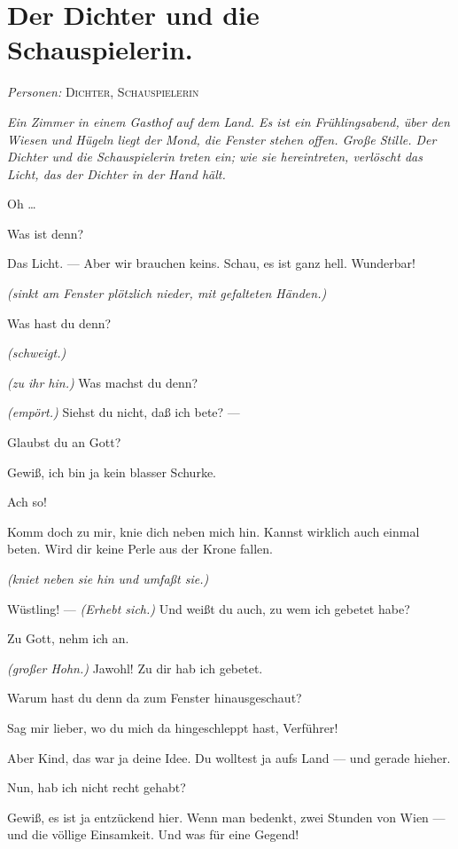 \documentclass[
	final,
	a4paper,
	ngerman,
	mpinclude = true, %
	twoside = true,
	open = right,
	cleardoublepage = plain,
	DIV = 13,
	BCOR = 1cm,
	titlepage = firstiscover,
	]{scrbook}
\newcommand{\scene}{\section}
\newcommand{\direction}[1]{\textit{(#1)}}
\newcommand{\setting}[1]{\vspace{-0.5\baselineskip}\centering\textit{#1}}
\newcommand{\characterlist}[1]{{\begin{center}\textit{Personen:} #1\end{center}}}
\newcommand{\thecharacter}[1]{\textup{\textsc{#1}}}
\newcommand{\thedichter}{\thecharacter{Dichter}}
\newcommand{\theschauspielerin}{\thecharacter{Schauspielerin}}
\newcommand{\character}[1]{\item[#1:]}
\newcommand{\dichter}{\character{\thedichter}}
\newcommand{\schauspielerin}{\character{\theschauspielerin}}
\begin{document}
\scene{Der Dichter und die Schauspielerin.}
\characterlist{\thedichter, \theschauspielerin}
\setting{Ein Zimmer in einem Gasthof auf dem Land. Es ist ein Frühlingsabend, über den Wiesen und Hügeln liegt der Mond, die Fenster stehen offen. Große Stille. Der Dichter und die Schauspielerin treten ein; wie sie hereintreten, verlöscht das Licht, das der Dichter in der Hand hält.}
\begin{play}
	\dichter
	Oh \ldots{}

	\schauspielerin
	Was ist denn?

	\dichter
	Das Licht. --- Aber wir brauchen keins. Schau, es ist ganz hell. Wunderbar!

	\schauspielerin
	\direction{sinkt am Fenster plötzlich nieder, mit gefalteten Händen.}

	\dichter
	Was hast du denn?

	\schauspielerin
	\direction{schweigt.}

	\dichter
	\direction{zu ihr hin.} Was machst du denn?

	\schauspielerin
	\direction{empört.} Siehst du nicht, daß ich bete? ---

	\dichter
	Glaubst du an Gott?

	\schauspielerin
	Gewiß, ich bin ja kein blasser Schurke.

	\dichter
	Ach so!

	\schauspielerin
	Komm doch zu mir, knie dich neben mich hin. Kannst wirklich auch einmal beten. Wird dir keine Perle aus der Krone fallen.

	\dichter
	\direction{kniet neben sie hin und umfaßt sie.}

	\schauspielerin
	Wüstling! --- \direction{Erhebt sich.} Und weißt du auch, zu wem ich gebetet habe?

	\dichter
	Zu Gott, nehm ich an.

	\schauspielerin
	\direction{großer Hohn.} Jawohl! Zu dir hab ich gebetet.

	\dichter
	Warum hast du denn da zum Fenster hinausgeschaut?

	\schauspielerin
	Sag mir lieber, wo du mich da hingeschleppt hast, Verführer!

	\dichter
	Aber Kind, das war ja deine Idee. Du wolltest ja aufs Land --- und gerade hieher.

	\schauspielerin
	Nun, hab ich nicht recht gehabt?

	\dichter
	Gewiß, es ist ja entzückend hier. Wenn man bedenkt, zwei Stunden von Wien --- und die völlige Einsamkeit. Und was für eine Gegend!


\end{play}
\end{document}
